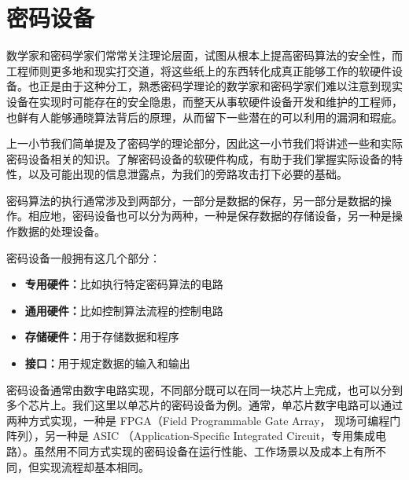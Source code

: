 


\section{密码设备} %
数学家和密码学家们常常关注理论层面，试图从根本上提高密码算法的安全性，而工程师则更多地和现实打交道，将这些纸上的东西转化成真正能够工作的软硬件设备。也正是由于这种分工，熟悉密码学理论的数学家和密码学家们难以注意到现实设备在实现时可能存在的安全隐患，而整天从事软硬件设备开发和维护的工程师，也鲜有人能够通晓算法背后的原理，从而留下一些潜在的可以利用的漏洞和瑕疵。

上一小节我们简单提及了密码学的理论部分，因此这一小节我们将讲述一些和实际密码设备相关的知识。了解密码设备的软硬件构成，有助于我们掌握实际设备的特性，以及可能出现的信息泄露点，为我们的旁路攻击打下必要的基础。

密码算法的执行通常涉及到两部分，一部分是数据的保存，另一部分是数据的操作。相应地，密码设备也可以分为两种，一种是保存数据的存储设备，另一种是操作数据的处理设备。

\vspace*{0.5\baselineskip}

密码设备一般拥有这几个部分：

\begin{itemize}
\item \textbf{专用硬件：}比如执行特定密码算法的电路
\item \textbf{通用硬件：}比如控制算法流程的控制电路
\item \textbf{存储硬件：}用于存储数据和程序
\item \textbf{接口：}用于规定数据的输入和输出
\end{itemize}

\vspace*{0.5\baselineskip}

密码设备通常由数字电路实现，不同部分既可以在同一块芯片上完成，也可以分到多个芯片上。我们这里以单芯片的密码设备为例。通常，单芯片数字电路可以通过两种方式实现，一种是 FPGA（Field Programmable Gate Array， 现场可编程门阵列），另一种是 ASIC （Application-Specific Integrated Circuit，专用集成电路）。虽然用不同方式实现的密码设备在运行性能、工作场景以及成本上有所不同，但实现流程却基本相同。

